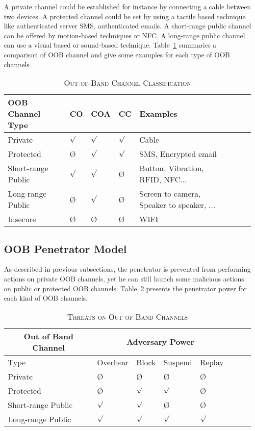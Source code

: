 A private channel could be established for instance by connecting a cable between two devices. A protected channel could be set by using a tactile based technique like authenticated server SMS, authenticated emails. A short-range public channel can be offered by motion-based techniques or NFC. A long-range public channel can use a visual based or sound-based technique. Table~\ref{tableproperties} summaries a comparison of OOB channel and give some examples for each type of OOB channels.

\begin{table}
\centering
\caption{\textsc{Out-of-Band Channel Classification}}
\label{tableproperties}
{\scriptsize
\begin{tabular}{ l l l l l l l l | }
\hline
OOB Channel Type & CO & COA & CC & Examples \\
\hline\hline
Private & $\surd$ & $\surd$ & $\surd$ & Cable \\ \hline
Protected & \O & $\surd$ & $\surd$ & SMS, Encrypted email \\ \hline
Short-range Public & $\surd$ & $\surd$ & \O & Button, Vibration, RFID, NFC... \\ \hline
Long-range Public & \O & $\surd$& \O & Screen to camera, Speaker to speaker, ... \\ \hline
Insecure & \O & \O & \O & WIFI \\ 
\end{tabular}
}
\end{table}


\subsection{OOB Penetrator Model}

As described in previous subsections, the penetrator is prevented from performing actions on private OOB channels, yet he can still launch some malicious actions on public or protected OOB channels. Table~\ref{tableattack} presents the penetrator power for each kind of OOB channels.

\begin{table}
\centering
\caption{\textsc{Threats on Out-of-Band Channels}}
\label{tableattack}
{\scriptsize
\begin{tabular}{ l l l l l l l l | }
\hline
\multicolumn{1}{c}{Out of Band Channel} & \multicolumn{4}{c}{Adversary Power} \\
\hline
\hline
Type & Overhear & Block & Suspend & Replay \\
\hline\hline
Private & \O & \O & \O & \O  \\ \hline
Protected & \O & $\surd$ & $\surd$ & \O  \\ \hline
Short-range Public & $\surd$ & $\surd$ & \O & \O  \\ \hline
Long-range Public & $\surd$ & $\surd$ & $\surd$& $\surd$ \\ \hline
\end{tabular}
}
\end{table}

